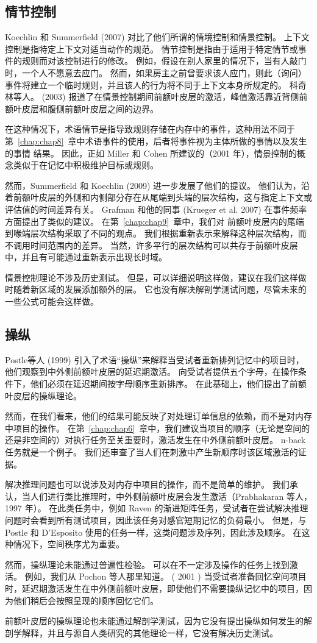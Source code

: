 \subsection{情节控制}
Koechlin 和 Summerfield (2007) 对比了他们所谓的情境控制和情景控制。 上下文控制是指特定上下文对适当动作的规范。 情节控制是指由于适用于特定情节或事件的规则而对该控制进行的修改。 例如，假设在别人家里的情况下，当有人敲门时，一个人不愿意去应门。 然而，如果房主之前曾要求该人应门，则此（询问）事件将建立一个临时规则，并且该人的行为将不同于上下文本身所规定的。 科奇林等人。 (2003) 报道了在情景控制期间前额叶皮层的激活，峰值激活靠近背侧前额叶皮层和腹侧前额叶皮层之间的边界。
\par 
在这种情况下，术语情节是指导致规则存储在内存中的事件，这种用法不同于第~\ref{chap:chap8}~章中术语事件的使用，后者将事件视为主体所做的事情以及发生的事情 结果。 因此，正如 Miller 和 Cohen 所建议的（2001 年），情景控制的概念类似于在记忆中积极维护目标或规则。
\par 
然而，Summerfield 和 Koechlin (2009) 进一步发展了他们的提议。 他们认为，沿着前额叶皮层的外侧和内侧部分存在从尾端到头端的层次结构，这与指定上下文或评估值的时间差异有关。 Grafman 和他的同事 (Krueger et al. 2007) 在事件频率方面提出了类似的建议。 在第~\ref{chap:chap9}~章中，我们对 前额叶皮层内的尾端到喙端层次结构采取了不同的观点。 我们根据重新表示来解释这种层次结构，而不调用时间范围内的差异。 当然，许多平行的层次结构可以共存于前额叶皮层中，并且有可能通过重新表示出现长时域。
\par 
情景控制理论不涉及历史测试。 但是，可以详细说明这样做，建议在我们这样做时随着新区域的发展添加额外的层。 它也没有解决解剖学测试问题，尽管未来的一些公式可能会这样做。
\subsection{操纵}
Postle等人 (1999) 引入了术语“操纵”来解释当受试者重新排列记忆中的项目时，他们观察到中外侧前额叶皮层的延迟期激活。 向受试者提供五个字母，在操作条件下，他们必须在延迟期间按字母顺序重新排序。 在此基础上，他们提出了前额叶皮层的操纵理论。
\par 
然而，在我们看来，他们的结果可能反映了对处理订单信息的依赖，而不是对内存中项目的操作。 在第~\ref{chap:chap6}~章中，我们建议当项目的顺序（无论是空间的还是非空间的）对执行任务至关重要时，激活发生在中外侧前额叶皮层。 n-back 任务就是一个例子。 我们还审查了当人们在刺激中产生新顺序时该区域激活的证据。
\par 
解决推理问题也可以说涉及对内存中项目的操作，而不是简单的维护。 我们承认，当人们进行类比推理时，中外侧前额叶皮层会发生激活（Prabhakaran 等人，1997 年）。 在此类任务中，例如 Raven 的渐进矩阵任务，受试者在尝试解决推理问题时会看到所有测试项目，因此该任务对感官短期记忆的负荷最小。 但是，与 Postle 和 D'Esposito 使用的任务一样，这类问题涉及序列，因此涉及顺序。 在这种情况下，空间秩序尤为重要。
\par 
然而，操纵理论未能通过普遍性检验。 可以在不一定涉及操作的任务上找到激活。 例如，我们从 Pochon 等人那里知道。 ( 2001 ) 当受试者准备回忆空间项目时，延迟期激活发生在中外侧前额叶皮层，即使他们不需要操纵记忆中的项目，因为他们稍后会按照呈现的顺序回忆它们。
\par 
前额叶皮层的操纵理论也未能通过解剖学测试，因为它没有提出操纵如何发生的解剖学解释，并且与源自人类研究的其他理论一样，它没有解决历史测试。
